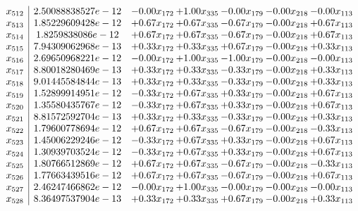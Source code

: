 \documentclass[8pt]{article}
\begin{document}
\[\begin{array}{c| c c@{\hskip 2pt} c@{\hskip 2pt} c@{\hskip 2pt} c@{\hskip 2pt} c@{\hskip 2pt} }
 x_{512}   &  2.50088838527e-12 & -0.00 x_{172} & +  1.00 x_{335} & -0.00 x_{179} & -0.00 x_{218} & -0.00 x_{113}\\
 x_{513}   &  1.85229609428e-12 & +  0.67 x_{172} & +  0.67 x_{335} & -0.67 x_{179} & -0.00 x_{218} & +  0.67 x_{113}\\
 x_{514}   &  1.8259838086e-12 & +  0.67 x_{172} & +  0.67 x_{335} & -0.67 x_{179} & -0.00 x_{218} & +  0.67 x_{113}\\
 x_{515}   &  7.94309062968e-13 & +  0.33 x_{172} & +  0.33 x_{335} & +  0.67 x_{179} & -0.00 x_{218} & +  0.33 x_{113}\\
 x_{516}   &  2.69650968221e-12 & -0.00 x_{172} & +  1.00 x_{335} & -1.00 x_{179} & -0.00 x_{218} & -0.00 x_{113}\\
 x_{517}   &  8.80018280469e-13 & +  0.33 x_{172} & +  0.33 x_{335} & -0.33 x_{179} & -0.00 x_{218} & +  0.33 x_{113}\\
 x_{518}   &  9.01445584844e-13 & +  0.33 x_{172} & +  0.33 x_{335} & -0.33 x_{179} & -0.00 x_{218} & +  0.33 x_{113}\\
 x_{519}   &  1.52899914951e-12 & -0.33 x_{172} & +  0.67 x_{335} & +  0.33 x_{179} & -0.00 x_{218} & +  0.67 x_{113}\\
 x_{520}   &  1.35580435767e-12 & -0.33 x_{172} & +  0.67 x_{335} & +  0.33 x_{179} & -0.00 x_{218} & +  0.67 x_{113}\\
 x_{521}   &  8.81572592704e-13 & +  0.33 x_{172} & +  0.33 x_{335} & -0.33 x_{179} & -0.00 x_{218} & +  0.33 x_{113}\\
 x_{522}   &  1.79600778694e-12 & +  0.67 x_{172} & +  0.67 x_{335} & -0.67 x_{179} & -0.00 x_{218} & -0.33 x_{113}\\
 x_{523}   &  1.45006229246e-12 & -0.33 x_{172} & +  0.67 x_{335} & +  0.33 x_{179} & -0.00 x_{218} & +  0.67 x_{113}\\
 x_{524}   &  1.30939703524e-12 & -0.33 x_{172} & +  0.67 x_{335} & +  0.33 x_{179} & -0.00 x_{218} & +  0.67 x_{113}\\
 x_{525}   &  1.80766512869e-12 & +  0.67 x_{172} & +  0.67 x_{335} & -0.67 x_{179} & -0.00 x_{218} & -0.33 x_{113}\\
 x_{526}   &  1.77663439516e-12 & +  0.67 x_{172} & +  0.67 x_{335} & -0.67 x_{179} & -0.00 x_{218} & +  0.67 x_{113}\\
 x_{527}   &  2.46247466862e-12 & -0.00 x_{172} & +  1.00 x_{335} & -0.00 x_{179} & -0.00 x_{218} & -0.00 x_{113}\\
 x_{528}   &  8.36497537904e-13 & +  0.33 x_{172} & +  0.33 x_{335} & +  0.67 x_{179} & -0.00 x_{218} & +  0.33 x_{113}\\

\end{array}\]
\end{document}
